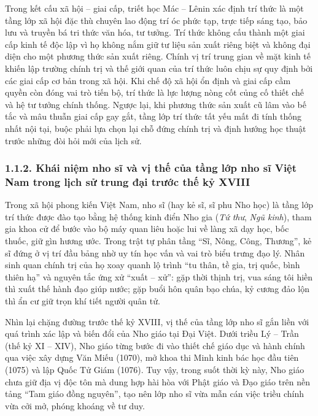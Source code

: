 Trong kết cấu xã hội -- giai cấp, triết học Mác -- Lênin xác định trí thức là một tầng lớp xã hội đặc thù chuyên lao động trí óc phức tạp, trực tiếp sáng tạo, bảo lưu và truyền bá tri thức văn hóa, tư tưởng. Trí thức không cấu thành một giai cấp kinh tế độc lập vì họ không nắm giữ tư liệu sản xuất riêng biệt và không đại diện cho một phương thức sản xuất riêng. Chính vị trí trung gian về mặt kinh tế khiến lập trường chính trị và thế giới quan của trí thức luôn chịu sự quy định bởi các giai cấp cơ bản trong xã hội. Khi chế độ xã hội ổn định và giai cấp cầm quyền còn đóng vai trò tiến bộ, trí thức là lực lượng nòng cốt củng cố thiết chế và hệ tư tưởng chính thống. Ngược lại, khi phương thức sản xuất cũ lâm vào bế tắc và mâu thuẫn giai cấp gay gắt, tầng lớp trí thức tất yếu mất đi tính thống nhất nội tại, buộc phải lựa chọn lại chỗ đứng chính trị và định hướng học thuật trước những đòi hỏi mới của lịch sử.

\subsubsection*{1.1.2. Khái niệm nho sĩ và vị thế của tầng lớp nho sĩ Việt Nam trong lịch sử trung đại trước thế kỷ XVIII}

Trong xã hội phong kiến Việt Nam, nho sĩ (hay kẻ sĩ, sĩ phu Nho học) là tầng lớp trí thức được đào tạo bằng hệ thống kinh điển Nho gia (\textit{Tứ thư}, \textit{Ngũ kinh}), tham gia khoa cử để bước vào bộ máy quan liêu hoặc lui về làng xã dạy học, bốc thuốc, giữ gìn hương ước. Trong trật tự phân tầng ``Sĩ, Nông, Công, Thương'', kẻ sĩ đứng ở vị trí đầu bảng nhờ uy tín học vấn và vai trò biểu trưng đạo lý. Nhân sinh quan chính trị của họ xoay quanh lộ trình ``tu thân, tề gia, trị quốc, bình thiên hạ'' và nguyên tắc ứng xử ``xuất -- xử'': gặp thời thịnh trị, vua sáng tôi hiền thì xuất thế hành đạo giúp nước; gặp buổi hôn quân bạo chúa, kỷ cương đảo lộn thì ẩn cư giữ trọn khí tiết người quân tử.

Nhìn lại chặng đường trước thế kỷ XVIII, vị thế của tầng lớp nho sĩ gắn liền với quá trình xác lập và biến đổi của Nho giáo tại Đại Việt. Dưới triều Lý -- Trần (thế kỷ XI -- XIV), Nho giáo từng bước đi vào thiết chế giáo dục và hành chính qua việc xây dựng Văn Miếu (1070), mở khoa thi Minh kinh bác học đầu tiên (1075) và lập Quốc Tử Giám (1076). Tuy vậy, trong suốt thời kỳ này, Nho giáo chưa giữ địa vị độc tôn mà dung hợp hài hòa với Phật giáo và Đạo giáo trên nền tảng ``Tam giáo đồng nguyên'', tạo nên lớp nho sĩ vừa mẫn cán việc triều chính vừa cởi mở, phóng khoáng về tư duy.


